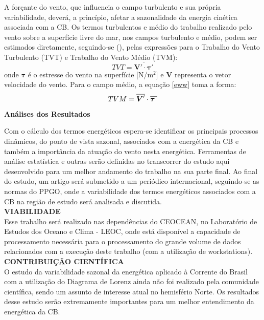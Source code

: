 \documentclass[portuguese,12pt,a4paper]{article}
\begin{document}
A forçante do vento, que influencia o campo turbulento e sua própria variabilidade, deverá, a princípio, afetar a sazonalidade da energia cinética associada com a CB. Os termos turbulentos e médio do trabalho realizado pelo vento sobre a superfície livre do mar, nos campos turbulento e médio, podem ser estimados diretamente, seguindo-se  (\citeyear{yan2023seasonal}), pelas expressões para o Trabalho do Vento Turbulento (TVT) e Trabalho do Vento Médio (TVM):
\begin{equation}\label{eww}
TVT = \overline{\boldsymbol{V}'\cdot \boldsymbol{\tau'}}
\end{equation} onde $\boldsymbol{\tau}$ é o estresse do vento na superfície [N/m$^2$] e $\boldsymbol{V}$ representa o vetor velocidade do vento. 
Para o campo médio, a equação \ref{eww} toma a forma:
\begin{equation}
TVM = \overline{\boldsymbol{V}'} \cdot \overline{\boldsymbol{\tau^{\textcolor{white}{.}}}}
\end{equation} 


\textbf{Análises dos Resultados}

Com o cálculo dos termos energéticos espera-se identificar os principais processos dinâmicos, do ponto de vista sazonal, associados com a energética da CB e também a importância da atuação do vento nesta energética. Ferramentas de análise estatística e outras serão definidas no transcorrer do estudo aqui desenvolvido para um melhor andamento do trabalho na sua parte final.
Ao final do estudo, um artigo será submetido a um periódico internacional, seguindo-se as normas do PPGO, onde a variabilidade dos termos energéticos associados com a CB na região de estudo será analisada e discutida.\\

\textbf{VIABILIDADE} \\ 

Esse trabalho será realizado nas dependências do CEOCEAN, no Laboratório de
Estudos dos Oceano e Clima - LEOC, onde está disponível a capacidade de
processamento necessária para o processamento do grande volume de dados
relacionados com a execução deste trabalho (com a utilização de workstations). \\

\textbf{CONTRIBUIÇÃO CIENTÍFICA} \\

O estudo da variabilidade sazonal da energética aplicado à Corrente do Brasil com a
utilização do Diagrama de Lorenz ainda não foi realizado pela comunidade científica,
sendo um assunto de interesse atual no hemisfério Norte. Os resultados desse estudo
serão extremamente importantes para um melhor entendimento da energética da CB. \\
\end{document}
